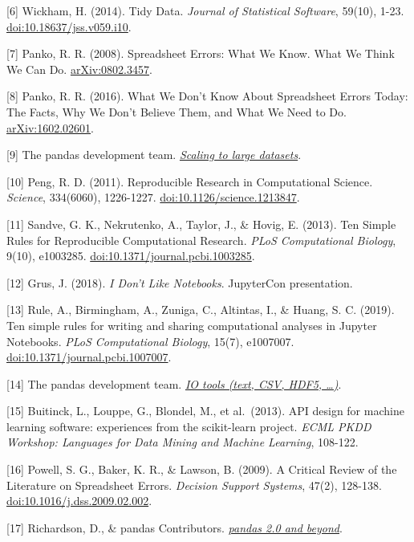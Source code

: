 \documentclass[
  12pt,
]{article}
\begin{document}
{[}6{]} Wickham, H. (2014). Tidy Data. \emph{Journal of Statistical
Software}, 59(10), 1-23.
\href{https://doi.org/10.18637/jss.v059.i10}{doi:10.18637/jss.v059.i10}.

{[}7{]} Panko, R. R. (2008). Spreadsheet Errors: What We Know. What We
Think We Can Do.
\href{https://arxiv.org/abs/0802.3457}{arXiv:0802.3457}.

{[}8{]} Panko, R. R. (2016). What We Don't Know About Spreadsheet Errors
Today: The Facts, Why We Don't Believe Them, and What We Need to Do.
\href{https://arxiv.org/abs/1602.02601}{arXiv:1602.02601}.

{[}9{]} The pandas development team.
\href{https://pandas.pydata.org/docs/user_guide/scale.html}{\emph{Scaling
to large datasets}}.

{[}10{]} Peng, R. D. (2011). Reproducible Research in Computational
Science. \emph{Science}, 334(6060), 1226-1227.
\href{https://doi.org/10.1126/science.1213847}{doi:10.1126/science.1213847}.

{[}11{]} Sandve, G. K., Nekrutenko, A., Taylor, J., \& Hovig, E. (2013).
Ten Simple Rules for Reproducible Computational Research. \emph{PLoS
Computational Biology}, 9(10), e1003285.
\href{https://doi.org/10.1371/journal.pcbi.1003285}{doi:10.1371/journal.pcbi.1003285}.

{[}12{]} Grus, J. (2018). \emph{I Don't Like Notebooks}. JupyterCon
presentation.

{[}13{]} Rule, A., Birmingham, A., Zuniga, C., Altintas, I., \& Huang,
S. C. (2019). Ten simple rules for writing and sharing computational
analyses in Jupyter Notebooks. \emph{PLoS Computational Biology}, 15(7),
e1007007.
\href{https://doi.org/10.1371/journal.pcbi.1007007}{doi:10.1371/journal.pcbi.1007007}.

{[}14{]} The pandas development team.
\href{https://pandas.pydata.org/docs/user_guide/io.html}{\emph{IO tools
(text, CSV, HDF5, \ldots)}}.

{[}15{]} Buitinck, L., Louppe, G., Blondel, M., et al.~(2013). API
design for machine learning software: experiences from the scikit-learn
project. \emph{ECML PKDD Workshop: Languages for Data Mining and Machine
Learning}, 108-122.

{[}16{]} Powell, S. G., Baker, K. R., \& Lawson, B. (2009). A Critical
Review of the Literature on Spreadsheet Errors. \emph{Decision Support
Systems}, 47(2), 128-138.
\href{https://doi.org/10.1016/j.dss.2009.02.002}{doi:10.1016/j.dss.2009.02.002}.

{[}17{]} Richardson, D., \& pandas Contributors.
\href{https://pandas.pydata.org/docs/whatsnew/index.html}{\emph{pandas
2.0 and beyond}}.
\end{document}
